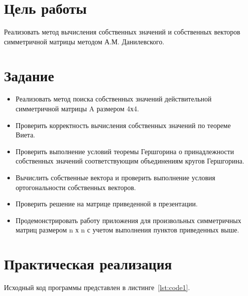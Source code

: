 \documentclass[a4paper, 14pt]{extarticle}
\begin{document}
\renewcommand{\ttdefault}{pcr}

\setlength{\tabcolsep}{3pt}
\newpage
\setcounter{page}{2}

\section{Цель работы}\label{Sect::goal}

Реализовать метод вычисления собственных значений и собственных
векторов симметричной матрицы методом А.М. Данилевского.

\section{Задание}\label{Sect::task}

\begin{itemize}
    \item Реализовать метод поиска собственных значений действительной симметричной матрицы A размером 4х4.
    \item Проверить корректность вычисления собственных значений по теореме Виета.
    \item Проверить выполнение условий теоремы Гершгорина о принадлежности собственных значений соответствующим объединениям кругов Гершгорина.
    \item Вычислить собственные вектора и проверить выполнение условия ортогональности собственных векторов.
    \item Проверить решение на матрице приведенной в презентации.
    \item Продемонстрировать работу приложения для произвольных симметричных матриц размером n х n с учетом выполнения пунктов приведенных выше.
\end{itemize}

\section{Практическая реализация}\label{Sect::code}

Исходный код программы представлен в листинге~\ref{lst:code1}.
\end{document}
